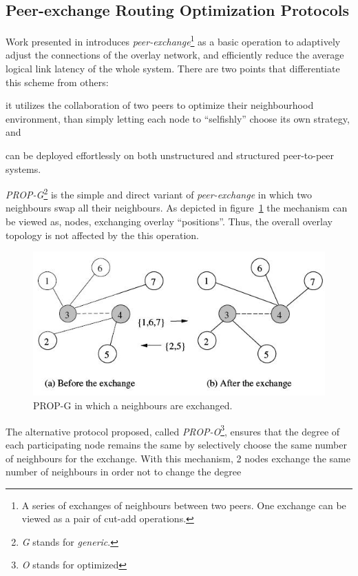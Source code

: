 \documentclass[a4paper,10pt]{article}
\begin{document}
\subsection{Peer-exchange Routing Optimization Protocols}
Work presented in \cite{qiu_prop_2007} introduces \emph{peer-exchange}\footnote{A series of exchanges of neighbours between two peers. One exchange can be viewed as a pair of cut-add operations.} as a basic operation to adaptively adjust the connections of the overlay network, and efficiently reduce the average logical link latency of the whole system. There are two points that differentiate this scheme from others:
\begin{inparaenum}
  \item it utilizes the collaboration of two peers to optimize their neighbourhood environment, than simply letting each node to ``selfishly'' choose its own strategy, and
  \item can be deployed effortlessly on both unstructured and structured peer-to-peer systems.
\end{inparaenum}

\emph{PROP-G}\footnote{\emph{G} stands for \emph{generic}.} is the simple and direct variant of \emph{peer-exchange} in which two neighbours swap all their neighbours. As depicted in figure~\ref{figure:prop-g} the mechanism can be viewed as, nodes, exchanging overlay ``positions''. Thus, the overall overlay topology is not affected by the this operation.

\begin{figure}
\centering
  \includegraphics[scale=0.4]{img/prop-g.jpeg}
\caption{PROP-G in which a neighbours are exchanged.}
\label{figure:prop-g}
\end{figure}

The alternative protocol proposed, called \emph{PROP-O}\footnote{\emph{O} stands for optimized}, ensures that the degree of each participating node remains the same by selectively choose the same number of neighbours for the exchange. With this mechanism, 2 nodes exchange the same number of neighbours in order not to change the degree
\end{document}
